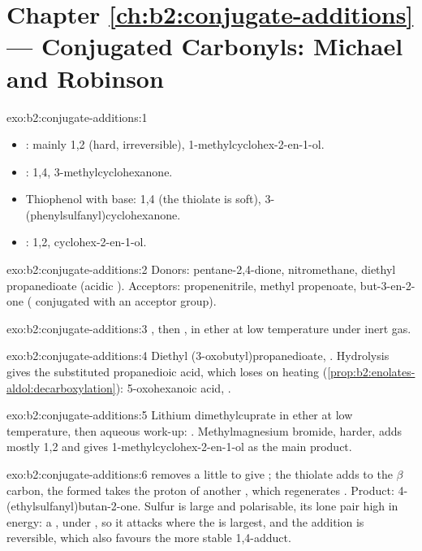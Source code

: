 \section*{Chapter \ref{ch:b2:conjugate-additions} --- Conjugated Carbonyls: Michael and Robinson}

\begin{solution}{exo:b2:conjugate-additions:1}
\begin{itemize}
  \item {}: mainly 1,2 (hard, irreversible), 1-methylcyclohex-2-en-1-ol.
  \item {}: 1,4, 3-methylcyclohexanone.
  \item Thiophenol with base: 1,4 (the thiolate is soft), 3-(phenylsulfanyl)cyclohexanone.
  \item {}: 1,2, cyclohex-2-en-1-ol.
\end{itemize}
\end{solution}

\begin{solution}{exo:b2:conjugate-additions:2}
Donors: pentane-2,4-dione, nitromethane, diethyl propanedioate (acidic ). Acceptors:
propenenitrile, methyl propenoate, but-3-en-2-one ( conjugated with an acceptor group).
\end{solution}

\begin{solution}{exo:b2:conjugate-additions:3}
, then , in ether at low
temperature under inert gas.
\end{solution}

\begin{solution}{exo:b2:conjugate-additions:4}
Diethyl (3-oxobutyl)propanedioate, . Hydrolysis gives the substituted
propanedioic acid, which loses  on heating (\cref{prop:b2:enolates-aldol:decarboxylation}):
5-oxohexanoic acid, .
\end{solution}

\begin{solution}{exo:b2:conjugate-additions:5}
Lithium dimethylcuprate in ether at low temperature, then aqueous work-up: .
Methylmagnesium bromide, harder, adds mostly 1,2 and gives 1-methylcyclohex-2-en-1-ol as the main
product.
\end{solution}

\begin{solution}{exo:b2:conjugate-additions:6}
 removes a little  to give ; the thiolate adds to the $\beta$ carbon, the
 formed takes the proton of another , which regenerates . Product:
4-(ethylsulfanyl)butan-2-one. Sulfur is large and polarisable, its lone pair high in energy: a , under , so it attacks where the  is largest, and the addition is
reversible, which also favours the more stable 1,4-adduct.
\end{solution}

